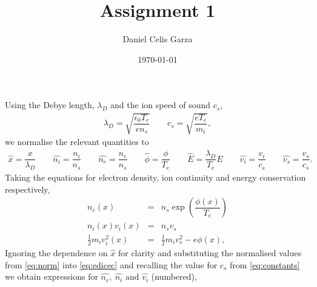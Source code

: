 \documentclass[10pt,a4paper]{article}
\begin{document}
	\title{Assignment 1}
	\author{Daniel Celis Garza}
	\date{\today}
	\maketitle
	
	Using the Debye length, $\lambda_{D}$ and the ion speed of sound $c_{s}$,
	\begin{subequations}
		\begin{eqnarray} \label{eq:constants}
			\lambda_{D} = \sqrt{\dfrac{\epsilon_{0} T_{e}}{e n_s}} \qquad
			c_{s} = \sqrt{\dfrac{e T_{e}}{m_{i}}},
		\end{eqnarray}
	\end{subequations}
	we normalise the relevant quantities to
	\begin{subequations}
		\begin{eqnarray} \label{eq:norm}
			\hat{x} = \dfrac{x}{\lambda_{D}} \qquad
			\widehat{n_{i}} = \dfrac{n_{i}}{n_{s}} \qquad
			\widehat{n_{e}} = \dfrac{n_{e}}{n_{s}} \qquad
			\hat{\phi} = \dfrac{\phi}{T_{e}} \qquad
			\hat{E} = \dfrac{\lambda_{D}}{T_{e}} E \qquad
			\widehat{v_{i}} = \dfrac{v_{i}}{c_{s}} \qquad
			\widehat{v_{s}} = \dfrac{v_{s}}{c_{s}}.
		\end{eqnarray}
	\end{subequations}
	Taking the equations for electron density, ion continuity and energy conservation respectively,	
	\begin{subequations}
		\begin{eqnarray} \label{eq:edicec}
			n_{e}(x) &=& n_{s} \exp\left(\dfrac{\phi(x)}{T_{e}}\right)\\
			n_{i}(x) v_{i}(x) &=& n_{s} v_{s} \\
			\frac{1}{2} m_{i} v_{i}^{2}(x) &=& \frac{1}{2}m_{i} v_{s}^{2} - e \phi(x),
		\end{eqnarray}
	\end{subequations}
	Ignoring the dependence on $\hat{x}$ for clarity and substituting the normalised values from \cref{eq:norm} into \cref{eq:edicec} and recalling the value for $c_{s}$ from \cref{eq:constants} we obtain expressions for $\widehat{n_{e}},~\widehat{n_{i}} \textrm{ and } \widehat{v_{i}}$ (numbered),
\end{document}
